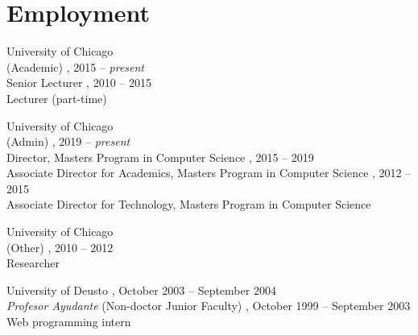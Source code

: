 \documentclass{resume}
\author{Borja Sotomayor}
\begin{document}
\maketitle	

\section*{\hspace{-1cm}Employment}
\begin{category}{University of Chicago\\(Academic)}
, 2015 -- \emph{present}\\
Senior Lecturer
, 2010 -- 2015\\
Lecturer (part-time)
\end{category}
\begin{category}{University of Chicago\\(Admin)}
, 2019 -- \emph{present}\\
Director, Masters Program in Computer Science
, 2015 -- 2019\\
Associate Director for Academics, Masters Program in Computer Science
, 2012 -- 2015\\
Associate Director for Technology, Masters Program in Computer Science
\end{category}
\begin{category}{University of Chicago\\(Other)}
, 2010 -- 2012\\
Researcher
\end{category}
\begin{category}{University of Deusto}
, October 2003 -- September 2004\\
\emph{Profesor Ayudante} (Non-doctor Junior Faculty)
, October 1999 -- September 2003\\
Web programming intern
\end{category}

\end{document}

